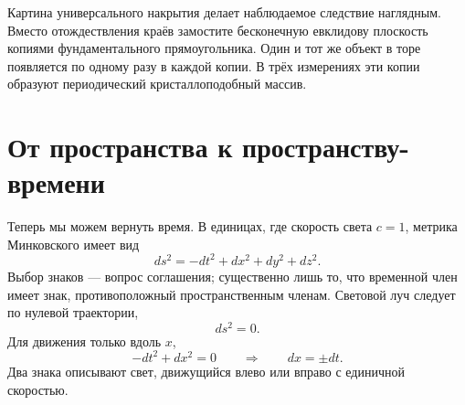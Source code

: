 Картина универсального накрытия делает наблюдаемое следствие наглядным. Вместо отождествления краёв замостите бесконечную евклидову плоскость копиями фундаментального прямоугольника. Один и тот же объект в торе появляется по одному разу в каждой копии. В трёх измерениях эти копии образуют периодический кристаллоподобный массив.

\begin{classroomqa}
\end{classroomqa}

\begin{classroomqa}
\end{classroomqa}

\section{От пространства к пространству-времени}

Теперь мы можем вернуть время. В единицах, где скорость света \(c=1\), метрика Минковского имеет вид
\begin{equation}
ds^2 = -dt^2 + dx^2 + dy^2 + dz^2.
\label{eq:c03-minkowski}
\end{equation}
Выбор знаков — вопрос соглашения; существенно лишь то, что временной член имеет знак, противоположный пространственным членам. Световой луч следует по нулевой траектории,
\begin{equation}
ds^2 = 0.
\end{equation}
Для движения только вдоль \(x\),
\begin{equation}
-dt^2 + dx^2 = 0
\qquad\Rightarrow\qquad
dx = \pm dt.
\label{eq:c03-null-flat}
\end{equation}
Два знака описывают свет, движущийся влево или вправо с единичной скоростью.

